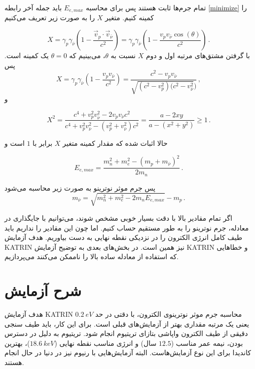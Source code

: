 \documentclass[a4paper,11pt,oneside,openany]{iut-thesis}
\begin{document}
تمام جرم‌ها ثابت هستند پس برای محاسبه $E_{e, max}$ باید جمله آخر رابطه 
\ref{minimize}
 را کمینه کنیم. متغیر $X$ را به صورت زیر تعریف می‌کنیم

\begin{equation}
X = \gamma_{p} \gamma_{\bar{\nu}} (1 - \frac{\vec{v}_{p} \cdot \vec{v}_{\bar{\nu}}}{c^{2}}) = \gamma_{p} \gamma_{\bar{\nu}} (1 - \frac{v_{p} v_{\bar{\nu}} \cos(\theta)}{c^{2}})\,.
\end{equation}
با گرفتن مشتق‌های مرتبه اول و دوم $X$ نسبت به $\theta$، می‌بینیم که
 $\theta = 0$ 
یک کمینه است. پس 
\begin{equation}
X = \gamma_{p} \gamma_{\bar{\nu}} (1 - \frac{v_{p} v_{\bar{\nu}}}{c^{2}}) = \frac{c^{2} - v_{p} v_{\bar{\nu}}}{\sqrt{(c^{2} - v_{p}^{2}) (c^{2} - v_{\bar{\nu}}^{2}})}\,,
\end{equation}
و

\begin{equation}
X^{2} = \frac{c^{4} + v_{p}^{2} v_{\bar{\nu}}^{2} - 2 v_{p} v_{\bar{\nu}} c^{2}}{c^{4} + v_{p}^{2} v_{\bar{\nu}}^{2} - (v_{p}^{2} + v_{\bar{\nu}}^{2}) c^{2}} = \frac{a - 2 x y}{a - (x^{2} + y^{2})} \geq 1 \, .
\end{equation}

حالا اثبات شده که مقدار کمینه متغیر $X$ برابر با $1$ است و

\begin{equation}
E_{e, max} = \frac{m_{n}^{2} + m_{e}^{2} - (m_{p} + m_{\bar{\nu}})^{2}}{2 m_{n}} \, .
\end{equation}

پس جرم موثر نوترینو به صورت زیر محاسبه می‌شود
\begin{equation}
m_{\bar{\nu}} = \sqrt{m_{n}^{2} + m_{e}^{2} - 2 m_{n} E_{e, max}} - m_{p} \, .
\end{equation}

اگر تمام مقادیر بالا با دقت بسیار خوبی مشخص شوند، می‌توانیم با جایگذاری در معادله، جرم نوترینو را به طور مستقیم حساب کنیم. اما چون این مقادیر را نداریم باید طیف کامل انرژی الکترون را در نزدیکی نقطه نهایی به دست بیاوریم. هدف آزمایش KATRIN نیز همین است. در بخش‌های بعدی به توضیح آزمایش KATRIN و خطاهایی که استفاده از معادله ساده بالا را ناممکن می‌کنند می‌پردازیم.



\section{
شرح آزمایش
}
هدف آزمایش KATRIN محاسبه جرم موثر نوترینوی الکترون، با دقتی در حد $0.2~eV$ یعنی یک مرتبه مقداری بهتر از آزمایش‌های قبلی است. برای این کار، باید طیف سنجی دقیقی از طیف الکترون واپاشی بتازای تریتیوم انجام شود. تریتیوم به دلیل در دسترس بودن، نیمه عمر مناسب ($12.5$ سال) و انرژی مناسب نقطه نهایی ($18.6~keV$)، بهترین کاندیدا برای این نوع آزمایش‌هاست. البته آزمایش‌هایی با رنیوم نیز در دنیا در حال انجام هستند.
\end{document}
